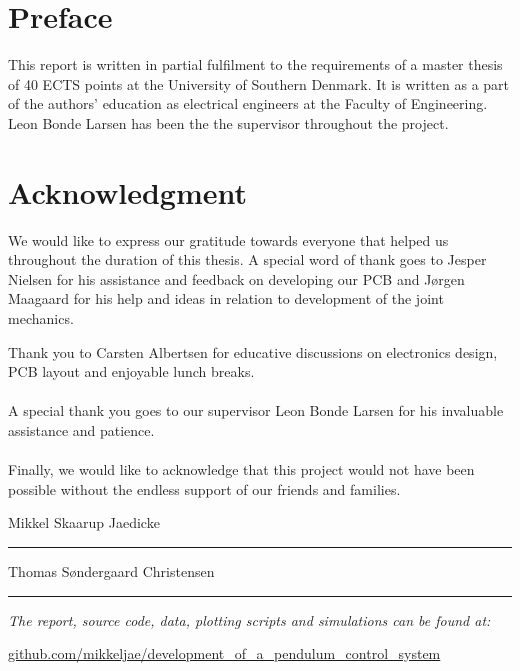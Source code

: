 
\section*{Preface}
This report is written in partial fulfilment to the requirements of a master thesis of 40 ECTS points at the University of Southern Denmark.
It is written as a part of the authors' education as electrical engineers at the Faculty of Engineering.
\\
Leon Bonde Larsen has been the the supervisor throughout the project.

\section*{Acknowledgment}

We would like to express our gratitude towards everyone that helped us throughout the duration of this thesis.
A special word of thank goes to Jesper Nielsen for his assistance and feedback on developing our PCB and Jørgen Maagaard for his help and ideas in relation to development of the joint mechanics. 

Thank you to Carsten Albertsen for educative discussions on electronics design, PCB layout and enjoyable lunch breaks. 
\\~\\
A special thank you goes to our supervisor Leon Bonde Larsen for his invaluable assistance and patience.
\\~\\
Finally, we would like to acknowledge that this project would not have been possible without the endless support of our friends and families.

\vspace{0.5cm}
\begin{center}
	\begin{minipage}[t]{.49\textwidth}\large
		\begin{center}
		Mikkel Skaarup Jaedicke\\
		\vspace{1cm}
		\hrule
		\vspace{0.5cm}
		Thomas Søndergaard Christensen
		\vspace{1cm}
		\hrule
		\end{center} 
	\end{minipage}
\end{center}

\vfill
  \begin{center}
    \textsl{The report, source code, data, plotting scripts and simulations can be found at:}  
    \end{center}
    \vspace{-5pt}
    \begin{center}
	\renewcommand{\UrlFont}{\color{black}\normalsize\tt}
    \url{github.com/mikkeljae/development_of_a_pendulum_control_system}
   \end{center}
\newpage

